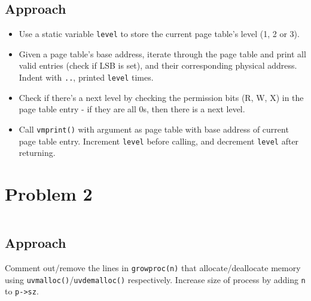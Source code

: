 \documentclass[11pt,a4paper,english]{paper}
\newenvironment{colorboxed}[4][gray]{
\begin{tcolorbox}[colback=#1!3!white,colframe=#1(ryb)!50!black,title=\textbf{#2: #3},#4]
}{
\end{tcolorbox}
}
\begin{document}
\subsection{Approach}
\begin{itemize}[noitemsep, nolistsep]
    \item Use a static variable \texttt{level} to store the current page table's level (1, 2 or 3).
    \item Given a page table's base address, iterate through the page table and print all valid entries (check if LSB is set), and their corresponding physical address. Indent with \texttt{..}, printed \texttt{level} times.
    \item Check if there's a next level by checking the permission bits (R, W, X) in the page table entry - if they are all 0s, then there is a next level.
    \item Call \texttt{vmprint()} with argument as page table with base address of current page table entry. Increment \texttt{level} before calling, and decrement \texttt{level} after returning.
\end{itemize}

\section{Problem 2}
\begin{colorboxed}{Code}{\texttt{kernel/proc.c::growproc()}}{unbreakable}
    \inputminted[baselinestretch=0.85,firstline=232,lastline=248,breaklines]{c}{kernel/proc.c}
\end{colorboxed}
\subsection{Approach}
Comment out/remove the lines in \texttt{growproc(n)} that allocate/deallocate memory using \texttt{uvmalloc()}/\texttt{uvdemalloc()} respectively. Increase size of process by adding \texttt{n} to \texttt{p->sz}.


%
%
\end{document}

